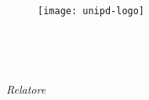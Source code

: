 \begin{titlepage}
    \begin{center}
        \begin{LARGE}
            \textbf{\myUni}\\
        \end{LARGE}

        \vspace{10pt}

        \begin{Large}
            \textsc{\myDepartment}\\
        \end{Large}

        \vspace{10pt}

        \begin{large}
            \textsc{\myFaculty}\\
        \end{large}

        \vspace{30pt}
        \begin{figure}[htbp]
            \centering
            \texttt{[image: unipd-logo]}
        \end{figure}
        \vspace{30pt}

        \begin{LARGE}
            \textbf{\myTitle}\\
        \end{LARGE}

        \vspace{10pt}

        \begin{large}
            \textsl{\myDegree}\\
        \end{large}

        \vspace{40pt}

        \begin{large}
            \begin{flushleft}
                \textit{Relatore}\\
                \vspace{5pt}
                \profTitle\ \myProf
            \end{flushleft}

            \vspace{-52pt}


\end{large}
\end{center}
\end{titlepage}
